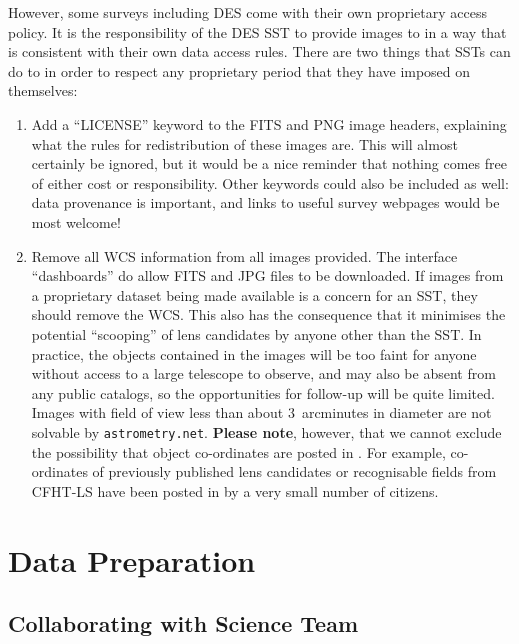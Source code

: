 \documentclass[a4paper,twocolumn]{article}
\begin{document}
However, some surveys including DES come with their own proprietary access policy. It is the responsibility
of the DES SST to provide images to \sw in a way that is consistent
with their own data access rules. There are two things that SSTs can
do to in order to respect any proprietary period that they have imposed on
themselves:
\begin{enumerate}

\item Add a ``LICENSE'' keyword to the FITS and PNG image headers, explaining
what the rules for redistribution of these images are. This will almost
certainly be ignored, but it would be a nice reminder that nothing comes free
of either cost or responsibility. Other keywords could also be included as
well: data provenance is important, and links to useful survey webpages would
be most welcome!

\item Remove all WCS information from all images provided. The \sw interface ``dashboards'' do allow FITS and JPG files to be downloaded. If images from a proprietary dataset being made available is a concern for an SST, they should remove the WCS. This also has the consequence that it minimises the potential ``scooping'' of  lens candidates by anyone other than the SST. 
In practice, the objects contained in the \sw images will be too faint
for anyone without access to a large telescope to observe, and may also be
absent from any public catalogs, so the opportunities for follow-up will be
quite limited. Images
with field of view less than about 3~arcminutes in diameter are not solvable
by \texttt{astrometry.net}. \textbf{Please note}, however, that we cannot exclude the possibility that object co-ordinates are posted in \Talk. For example, co-ordinates of previously published lens candidates or recognisable fields from CFHT-LS have been posted in \Talk by a very small number of citizens.

\end{enumerate}


\section{Data Preparation}
\label{sec:data}

\subsection{Collaborating with \sw Science Team}
\end{document}
